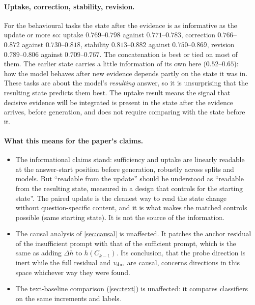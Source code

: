 \paragraph{Uptake, correction, stability, revision.} For the behavioural tasks the state after the evidence is as informative as the update or more so: uptake $0.769$--$0.798$ against $0.771$--$0.783$, correction $0.766$--$0.872$ against $0.730$--$0.818$, stability $0.813$--$0.882$ against $0.750$--$0.869$, revision $0.789$--$0.806$ against $0.709$--$0.767$. The concatenation is best or tied on most of them. The earlier state carries a little information of its own here ($0.52$--$0.65$): how the model behaves after new evidence depends partly on the state it was in. These tasks are about the model's \emph{resulting} answer, so it is unsurprising that the resulting state predicts them best. The uptake result means the signal that decisive evidence will be integrated is present in the state after the evidence arrives, before generation, and does not require comparing with the state before it.

\paragraph{What this means for the paper's claims.}
\begin{itemize}
  \item The informational claims stand: sufficiency and uptake are linearly readable at the answer-start position before generation, robustly across splits and models. But ``readable from the update'' should be understood as ``readable from the resulting state, measured in a design that controls for the starting state''. The paired update is the cleanest way to read the state change without question-specific content, and it is what makes the matched controls possible (same starting state). It is not the source of the information.
  \item The causal analysis of \cref{sec:causal} is unaffected. It patches the anchor residual of the insufficient prompt with that of the sufficient prompt, which is the same as adding $\Delta h$ to $h(C_{k-1})$. Its conclusion, that the probe direction is inert while the full residual and $v_{\mathrm{dm}}$ are causal, concerns directions in this space whichever way they were found.
  \item The text-baseline comparison (\cref{sec:text}) is unaffected: it compares classifiers on the same increments and labels.
\end{itemize}
